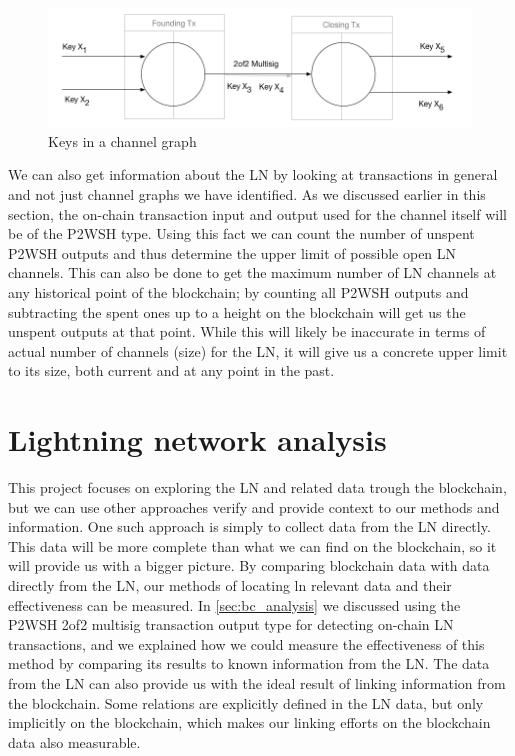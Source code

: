\begin{figure}[h]
    \centering
    \includegraphics[width=14cm]{figures/keys_subgraph.png}
    \caption{Keys in a channel graph}
    \label{fig:keys_graphs}
\end{figure}

We can also get information about the LN by looking at transactions in general and not just channel graphs we have identified.
As we discussed earlier in this section, the on-chain transaction input and output used for the channel itself will be of the P2WSH type. Using this fact we can count the number of unspent P2WSH outputs and thus determine the upper limit of possible open LN channels. 
This can also be done to get the maximum number of LN channels at any historical point of the blockchain; by counting all P2WSH outputs and subtracting the spent ones up to a height on the blockchain will get us the unspent outputs at that point. While this will likely be inaccurate in terms of actual number of channels (size) for the LN, it will give us a concrete upper limit to its size, both current and at any point in the past.


\section{Lightning network analysis}
\label{sec:ln_analysis}

This project focuses on exploring the LN and related data trough the blockchain, but we can use other approaches verify and provide context to our methods and information. One such approach is simply to collect data from the LN directly. This data will be more complete than what we can find on the blockchain, so it will provide us with a bigger picture. By comparing blockchain data with data directly from the LN, our methods of locating ln relevant data and their effectiveness can be measured. In \cref{sec:bc_analysis} we discussed using the P2WSH 2of2 multisig transaction output type for detecting on-chain LN transactions, and we explained how we could measure the effectiveness of this method by comparing its results to known information from the LN. The data from the LN can also provide us with the ideal result of linking information from the blockchain. Some relations are explicitly defined in the LN data, but only implicitly on the blockchain, which makes our linking efforts on the blockchain data also measurable.
\\

